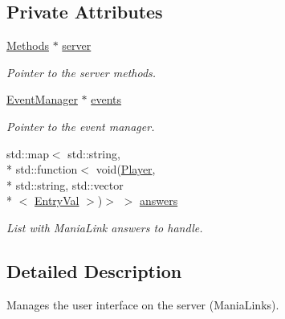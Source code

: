 \subsection*{Private Attributes}
\begin{DoxyCompactItemize}
\item 
\hypertarget{classUIManager_a33db2c26db770d39d59625138097cf4b}{\hyperlink{classMethods}{Methods} $\ast$ \hyperlink{classUIManager_a33db2c26db770d39d59625138097cf4b}{server}}\label{classUIManager_a33db2c26db770d39d59625138097cf4b}

\begin{DoxyCompactList}\small\item\em Pointer to the server methods. \end{DoxyCompactList}\item 
\hypertarget{classUIManager_aaa87b49b6a0329d8502cfb8e2ca9ab59}{\hyperlink{classEventManager}{Event\-Manager} $\ast$ \hyperlink{classUIManager_aaa87b49b6a0329d8502cfb8e2ca9ab59}{events}}\label{classUIManager_aaa87b49b6a0329d8502cfb8e2ca9ab59}

\begin{DoxyCompactList}\small\item\em Pointer to the event manager. \end{DoxyCompactList}\item 
\hypertarget{classUIManager_a06f9c65d5f61810311f6e7cd53bce55f}{std\-::map$<$ std\-::string, \\*
std\-::function$<$ void(\hyperlink{structPlayer}{Player}, \\*
std\-::string, std\-::vector\\*
$<$ \hyperlink{structEntryVal}{Entry\-Val} $>$)$>$ $>$ \hyperlink{classUIManager_a06f9c65d5f61810311f6e7cd53bce55f}{answers}}\label{classUIManager_a06f9c65d5f61810311f6e7cd53bce55f}

\begin{DoxyCompactList}\small\item\em List with Mania\-Link answers to handle. \end{DoxyCompactList}\end{DoxyCompactItemize}


\subsection{Detailed Description}
Manages the user interface on the server (Mania\-Links). 

